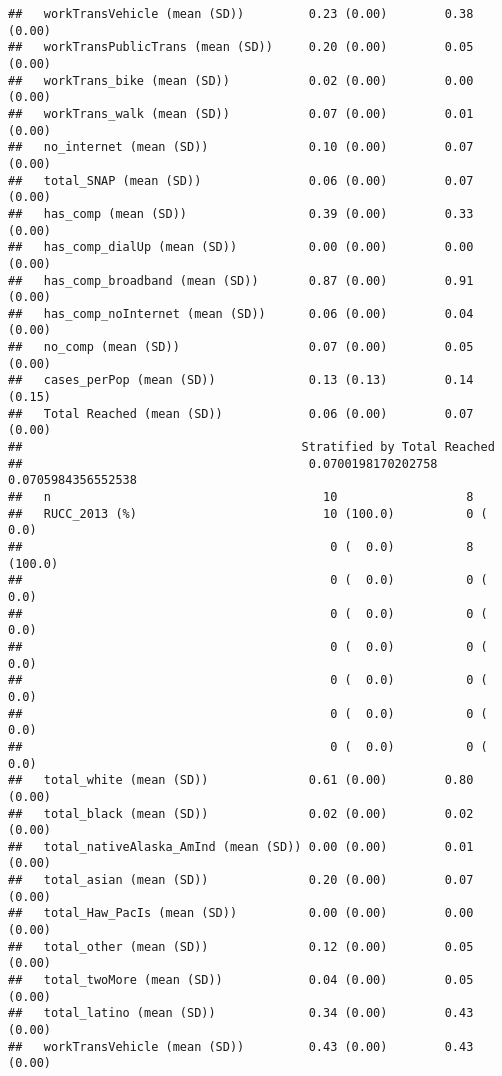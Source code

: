\documentclass[
]{article}
\begin{document}
\begin{verbatim}
##   workTransVehicle (mean (SD))         0.23 (0.00)        0.38 (0.00)       
##   workTransPublicTrans (mean (SD))     0.20 (0.00)        0.05 (0.00)       
##   workTrans_bike (mean (SD))           0.02 (0.00)        0.00 (0.00)       
##   workTrans_walk (mean (SD))           0.07 (0.00)        0.01 (0.00)       
##   no_internet (mean (SD))              0.10 (0.00)        0.07 (0.00)       
##   total_SNAP (mean (SD))               0.06 (0.00)        0.07 (0.00)       
##   has_comp (mean (SD))                 0.39 (0.00)        0.33 (0.00)       
##   has_comp_dialUp (mean (SD))          0.00 (0.00)        0.00 (0.00)       
##   has_comp_broadband (mean (SD))       0.87 (0.00)        0.91 (0.00)       
##   has_comp_noInternet (mean (SD))      0.06 (0.00)        0.04 (0.00)       
##   no_comp (mean (SD))                  0.07 (0.00)        0.05 (0.00)       
##   cases_perPop (mean (SD))             0.13 (0.13)        0.14 (0.15)       
##   Total Reached (mean (SD))            0.06 (0.00)        0.07 (0.00)       
##                                       Stratified by Total Reached
##                                        0.0700198170202758 0.0705984356552538
##   n                                      10                  8              
##   RUCC_2013 (%)                          10 (100.0)          0 (  0.0)      
##                                           0 (  0.0)          8 (100.0)      
##                                           0 (  0.0)          0 (  0.0)      
##                                           0 (  0.0)          0 (  0.0)      
##                                           0 (  0.0)          0 (  0.0)      
##                                           0 (  0.0)          0 (  0.0)      
##                                           0 (  0.0)          0 (  0.0)      
##                                           0 (  0.0)          0 (  0.0)      
##   total_white (mean (SD))              0.61 (0.00)        0.80 (0.00)       
##   total_black (mean (SD))              0.02 (0.00)        0.02 (0.00)       
##   total_nativeAlaska_AmInd (mean (SD)) 0.00 (0.00)        0.01 (0.00)       
##   total_asian (mean (SD))              0.20 (0.00)        0.07 (0.00)       
##   total_Haw_PacIs (mean (SD))          0.00 (0.00)        0.00 (0.00)       
##   total_other (mean (SD))              0.12 (0.00)        0.05 (0.00)       
##   total_twoMore (mean (SD))            0.04 (0.00)        0.05 (0.00)       
##   total_latino (mean (SD))             0.34 (0.00)        0.43 (0.00)       
##   workTransVehicle (mean (SD))         0.43 (0.00)        0.43 (0.00)       

\end{verbatim}
\end{document}
